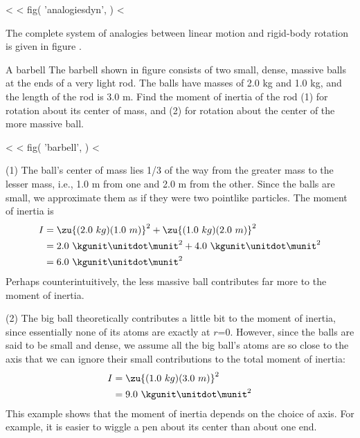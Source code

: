<%
<%
  fig(
    'analogiesdyn',
  )
<%

The complete system of analogies between linear motion and
rigid-body rotation is given in figure .

\begin{eg}{A barbell}\label{eg:barbell}
\egquestion
The barbell shown in figure  consists of two
small, dense, massive balls at the ends of a very light rod.
The balls have masses of 2.0 kg and 1.0 kg, and the length
of the rod is 3.0 m. Find the moment of inertia of the rod
(1) for rotation about its center of mass, and (2) for
rotation about the center of the more massive ball.

<%
<%
  fig(
    'barbell',
  )
<%

\eganswer
(1) The ball's center of mass lies 1/3 of the way from the
greater mass to the lesser mass, i.e., 1.0 m from one and 2.0
m from the other. Since the balls are small, we approximate
them as if they were two pointlike particles. The moment of
inertia is
\begin{align*}
         I        &=  \zu{(2.0\ kg)(1.0\ m)}^2 + \zu{(1.0\ kg)(2.0\ m)}^2 \\
                &=   2.0\ \kgunit\unitdot\munit^2
                         +  4.0\ \kgunit\unitdot\munit^2  \\
                &=   6.0\ \kgunit\unitdot\munit^2
\end{align*}
Perhaps counterintuitively, the less massive ball
contributes far more to the moment of inertia.

(2) The big ball theoretically contributes a little bit to
the moment of inertia, since essentially none of its atoms
are exactly at $r$=0. However, since the balls are said to be
small and dense, we assume all the big ball's atoms are so
close to the axis that we can ignore their small
contributions to the total moment of inertia:
\begin{align*}
         I                &=  \zu{(1.0\ kg)(3.0\ m)}^2 \\
                &        =   9.0\ \kgunit\unitdot\munit^2
\end{align*}
This example shows that the moment of inertia depends on the
choice of axis. For example, it is easier to wiggle a pen
about its center than about one end.
\end{eg}

